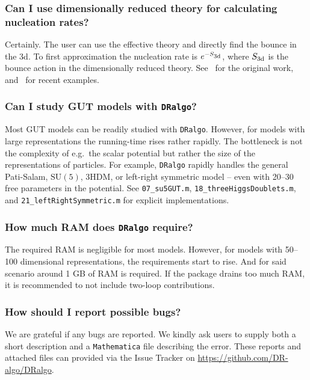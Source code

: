 \documentclass[11pt]{article}
\def\dralgo{{\tt DRalgo}}
\renewcommand{\rmi}[1]{{\mbox{\scriptsize #1}}}
\begin{document}
%
\subsubsection{Can I use dimensionally reduced theory for calculating nucleation rates?}
Certainly.
The user can use the effective theory and directly find
the bounce in the 3d. To first approximation the nucleation rate is
$e^{-S_\rmi{3d}}$, where
$S_\rmi{3d}$ is the bounce action in the dimensionally reduced theory.
See~\cite{Linde:1981zj} for the original work,
and~\cite{%
  Gould:2021ccf,Ekstedt:2021kyx,Hirvonen:2021zej,Ekstedt:2022tqk}
for recent examples.

%
\subsubsection{Can I study GUT models with \dralgo{}?}
Most GUT models can be readily studied with \dralgo{}.
However, for models with large representations the running-time rises rather rapidly.
The bottleneck is not the complexity of e.g.\ the scalar potential but rather
the size of the representations of particles.
For example, \dralgo{} rapidly handles the general
Pati-Salam,
$\mathrm{SU}(5)$,
3HDM, or
left-right symmetric model --
even with 20--30 free parameters in the potential.
See
{\tt{07\_su5GUT.m}},
{\tt{18\_threeHiggsDoublets.m}}, and
{\tt{21\_leftRightSymmetric.m}} 
for explicit implementations.

%
\subsubsection{How much RAM does \dralgo{} require?}

The required RAM is negligible for most models.
However, for models with 50--100 dimensional representations,
the requirements start to rise.
And for said scenario around 1 GB of RAM is required.
If the package drains too much RAM, it is recommended to not include
two-loop contributions.

%
\subsubsection{How should I report possible bugs?}
We are grateful if any bugs are reported.
We kindly ask users to supply both a short description and
a {\tt Mathematica} file describing the error.
These reports and attached files can provided via the Issue Tracker on 
\url{https://github.com/DR-algo/DRalgo}. 
\end{document}
